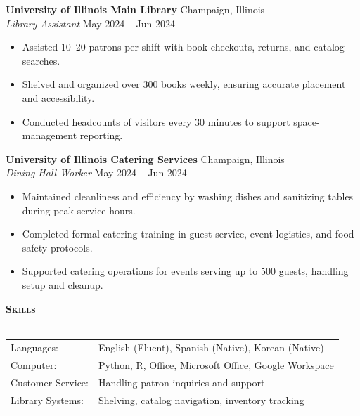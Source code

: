 \documentclass[a4paper]{article}
\newcommand{\lineunder} {
    \vspace*{-8pt} \\
    \hspace*{-18pt} \hrulefill \\
}
\newcommand{\header} [1] {
    {\hspace*{-18pt}\vspace*{6pt} \textsc{#1}}
    \vspace*{-6pt} \lineunder
}
\begin{document}
\vspace{1mm}

\textbf{University of Illinois Main Library} \hfill Champaign, Illinois\\
\textit{Library Assistant} \hfill May 2024 -- Jun 2024\\
\begin{itemize}[noitemsep]
  \item Assisted 10--20 patrons per shift with book checkouts, returns, and catalog searches.
  \item Shelved and organized over 300 books weekly, ensuring accurate placement and accessibility.
  \item Conducted headcounts of visitors every 30 minutes to support space-management reporting.
\end{itemize}

\vspace{1mm}

\textbf{University of Illinois Catering Services} \hfill Champaign, Illinois\\
\textit{Dining Hall Worker} \hfill May 2024 -- Jun 2024\\
\begin{itemize}[noitemsep]
  \item Maintained cleanliness and efficiency by washing dishes and sanitizing tables during peak service hours.
  \item Completed formal catering training in guest service, event logistics, and food safety protocols.
  \item Supported catering operations for events serving up to 500 guests, handling setup and cleanup.
\end{itemize}


\vspace*{1mm}

\header{\textbf{Skills}}
\begin{tabular}{ l l }
    Languages: & English (Fluent), Spanish (Native), Korean (Native)              \\
    Computer: & Python, R, Office, Microsoft Office, Google Workspace \\
    Customer Service: & Handling patron inquiries and support \\
    Library Systems: & Shelving, catalog navigation, inventory tracking \\
\end{tabular}


\vspace{1mm}
\end{document}
